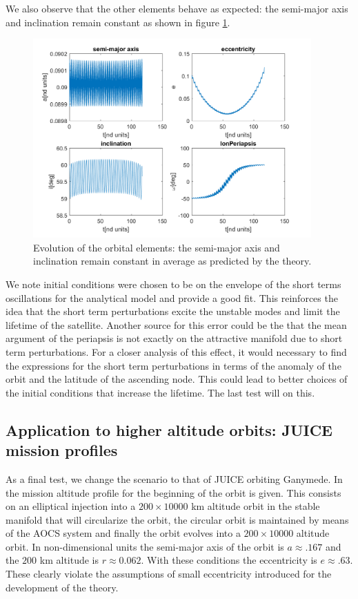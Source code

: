 We also observe that the other elements behave as expected: the semi-major axis and inclination remain constant as shown in figure \ref{fig:elementsUnstable}.

\begin{figure}[H]
	\centering
	\includegraphics[height=3in]
	{figures/Europa200km01e60i/elements.png}
	\caption{Evolution of the orbital elements: the semi-major axis and inclination remain constant in average as predicted by the theory.}
	\label{fig:elementsUnstable}
\end{figure}

We note initial conditions were chosen to be on the envelope of the short terms oscillations for the analytical model and provide a good fit. This reinforces the idea that the short term perturbations excite the unstable modes and limit the lifetime of the satellite. Another source for this error could be the that the mean argument of the periapsis is not exactly on the attractive manifold due to short term perturbations. For a closer analysis of this effect, it would necessary to find the expressions for the short term perturbations in terms of the anomaly of the orbit and the latitude of the ascending node. This could lead to better choices of the initial conditions that increase the lifetime. The last test will on this.

\subsection{Application to higher altitude orbits: JUICE mission profiles}

As a final test, we change the scenario to that of JUICE orbiting Ganymede. In \cite{esa2011juice} the mission altitude profile for the beginning of the orbit is given. This consists on an elliptical injection into a $200\times10000$ km altitude orbit in the stable manifold that will circularize the orbit, the circular orbit is maintained by means of the AOCS system and finally the orbit evolves into a $200\times 10000$ altitude orbit. In non-dimensional units the semi-major axis of the orbit is $a\approx.167$ and the $200$ km altitude is $ r \approx 0.062$. With these conditions the eccentricity is $e \approx .63$. These clearly violate the assumptions of small eccentricity introduced for the development of the theory.

